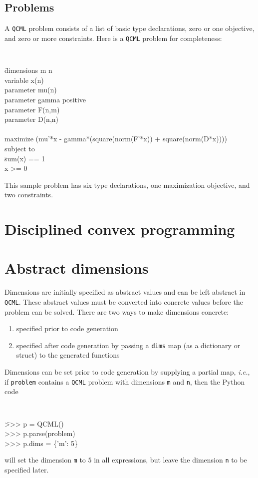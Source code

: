 \documentclass[11pt]{article}
\def\qcml{\texttt{QCML}\xspace}
\newcommand{\ie}{{\it i.e.}}
\begin{document}
\subsection{Problems}
A \qcml problem consists of a list of basic type declarations, zero or one
objective, and zero or more constraints. Here is a \qcml problem for
completeness:
{\tt
\begin{tabbing}
\qquad 
\= dimensions m n \\
\> variable x(n) \\
\> parameter mu(n)\\ 
\> parameter gamma positive\\
\> parameter F(n,m) \\
\> parameter D(n,n) \\
\\
\> maximize (mu'*x - gamma*(square(norm(F'*x)) + square(norm(D*x)))) \\
\> subject to \\
\> \qquad \= sum(x) == 1 \\
\> \> x >= 0
\end{tabbing}
}
This sample problem has six type declarations, one maximization objective, and
two constraints.

\section{Disciplined convex programming}
\label{s-dcp}

\section{Abstract dimensions}
\label{s-abstract-dims}
Dimensions are initially specified as abstract values and can be left abstract
in \qcml. These abstract values must be converted into concrete values
before the problem can be solved. There are two ways to make dimensions 
concrete:
\begin{enumerate}
\item specified prior to code generation
\item specified after code generation by passing a {\tt dims} map (as a
  dictionary or struct) to the generated functions %
\end{enumerate}

Dimensions can be set prior to code generation by supplying
a partial map, \ie, if {\tt problem} contains a \qcml problem with 
dimensions \texttt{m} and \texttt{n}, then the Python code
{\tt
\begin{tabbing}
  \qquad \= >>> p = QCML() \\
  \> >>> p.parse(problem) \\
  \> >>> p.dims = \{'m': 5\}
\end{tabbing}
}
\noindent will set the dimension {\tt m} to $5$ in all expressions, but leave 
the dimension {\tt n} to be specified later.
\end{document}
